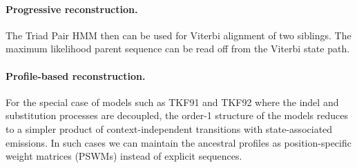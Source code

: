\paragraph{Progressive reconstruction.}
The Triad Pair HMM then can be used for Viterbi alignment of two siblings. The maximum likelihood parent sequence can be read off from the Viterbi state path.

\paragraph{Profile-based reconstruction.}
For the special case of models such as TKF91 and TKF92 where the indel and substitution processes are decoupled,
the order-1 structure of the models reduces to a simpler product of context-independent transitions with state-associated emissions.
In such cases we can maintain the ancestral profiles as position-specific weight matrices (PSWMs) instead of explicit sequences.
